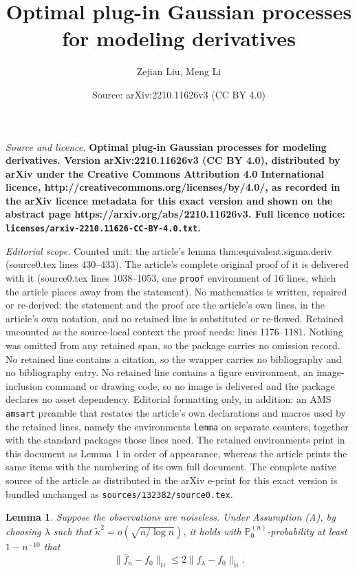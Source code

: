 \documentclass[10pt,a4paper]{amsart}
\title{\bf Optimal plug-in Gaussian processes for modeling derivatives}
\author{Zejian Liu, Meng Li}
\date{Source: arXiv:2210.11626v3 (CC BY 4.0)}
\newtheorem{lemma}{Lemma}
\newcommand{\PP}{\mathbb{P}}
\newcommand{\bbH}{\mathbb{H}}
\begin{document}
\maketitle

\noindent\emph{Source and licence.} \bf Optimal plug-in Gaussian processes for modeling derivatives. Version arXiv:2210.11626v3 (CC BY 4.0), distributed by arXiv under the Creative Commons Attribution 4.0 International licence, http://creativecommons.org/licenses/by/4.0/, as recorded in the arXiv licence metadata for this exact version and shown on the abstract page https://arxiv.org/abs/2210.11626v3. Full licence notice: \texttt{licenses/arxiv-2210.11626-CC-BY-4.0.txt}.\par\smallskip

\noindent\textit{Editorial scope.} Counted unit: the article's lemma thm:equivalent.sigma.deriv (source0.tex lines 430--433). The article's complete original proof of it is delivered with it (source0.tex lines 1038--1053, one \texttt{proof} environment of 16 lines, which the article places away from the statement). No mathematics is written, repaired or re-derived: the statement and the proof are the article's own lines, in the article's own notation, and no retained line is substituted or re-flowed.  Retained uncounted as the source-local context the proof needs: lines 1176--1181.  Nothing was omitted from any retained span, so the package carries no omission record.  No retained line contains a citation, so the wrapper carries no bibliography and no bibliography entry.  No retained line contains a figure environment, an image-inclusion command or drawing code, so no image is delivered and the package declares no asset dependency.  Editorial formatting only, in addition: an AMS \texttt{amsart} preamble that restates the article's own declarations and macros used by the retained lines, namely the environments \texttt{lemma} on separate counters, together with the standard packages those lines need.  The retained environments print in this document as Lemma 1 in order of appearance, whereas the article prints the same items with the numbering of its own full document.  The complete native source of the article as distributed in the arXiv e-print for this exact version is bundled unchanged as \texttt{sources/132382/source0.tex}.
\begin{lemma}\label{cor:h.tilde.noiseless}
Suppose the observations are noiseless. Under Assumption (A), by choosing $\lambda$ such that $\tilde{\kappa}^2=o(\sqrt{n/\log n})$, it holds with $\PP_0^{(n)}$-probability at least $1 - n^{-10}$ that
\begin{equation}
\|\hat{f}_n-f_0\|_{\tilde{\bbH}}\leq 2\|f_\lambda-f_0\|_{\tilde{\bbH}}.
\end{equation}
\end{lemma}
\end{document}

